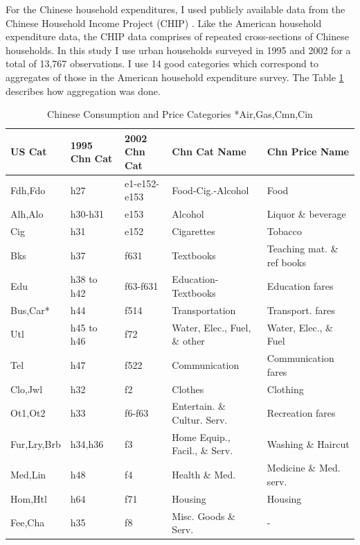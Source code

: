 \documentclass[12pt]{article}
\begin{document}
For the Chinese household expenditures, I used publicly available data from the Chinese Household Income Project (CHIP) \citep{CHIP2002}. Like the American household expenditure data, the CHIP data comprises of repeated cross-sections of Chinese households.  In this study I use urban households surveyed in 1995 and 2002 for a total of 13,767 observations.  I use 14 good categories which correspond to aggregates of those in the American household expenditure survey.   The Table \ref{tab:chncons} describes how aggregation was done.  
\begin{table}
    \centering
    \footnotesize
    \begin{sideways}
	\begin{tabular}{|l|l|l|l|l|}
	    	\hline
		\textbf{US Cat}			 & \textbf{1995 Chn Cat}  & \textbf{2002 Chn Cat}  & \textbf{Chn Cat Name} & \textbf{Chn Price Name}\\
		\hline
		Fdh,Fdo	 		 & h27	 	 & e1-e152-e153	 & Food-Cig.-Alcohol	 		 	 & Food\\ 
		\hline
		Alh,Alo	 		 & h30-h31	 & e153	 	 & Alcohol	 				 & Liquor \& beverage\\
		\hline
		Cig	 		 & h31	 	 & e152	 	 & Cigarettes	 				 & Tobacco\\ 
		\hline
		Bks	 		 & h37	 	 & f631	 	 & Textbooks	 				 & Teaching mat. \& ref books\\ 
		\hline
		Edu	 		 & h38 to h42	 & f63-f631	 & Education-Textbooks	 	 		 & Education fares\\ 
		\hline
		Bus,Car*		 & h44	 	 & f514	 	 & Transportation	 			 & Transport. fares\\ 
		\hline
		Utl	 		 & h45 to h46	 & f72	 	 & Water, Elec., Fuel, \& other	 	 	 & Water, Elec., \& Fuel\\ 
		\hline
		Tel	 		 & h47	 	 & f522	 	 & Communication	 			 & Communication fares\\ 
		\hline
		Clo,Jwl	 		 & h32	 	 & f2 	  	 & Clothes	 				 & Clothing\\ 
		\hline
		Ot1,Ot2	 		 & h33	 	 & f6-f63	 & Entertain. \& Cultur. Serv.		 	 & Recreation fares\\ 
		\hline
		Fur,Lry,Brb	 	 & h34,h36	 & f3 	 	 & Home Equip., Facil., \& Serv.		 & Washing \& Haircut\\ 
		\hline
		Med,Lin	 		 & h48	 	 & f4 	 	 & Health \& Med. 			 	 & Medicine \& Med. serv.\\ 
		\hline
		Hom,Htl	 		 & h64	 	 & f71	 	 & Housing	 			 	 & Housing\\ 
		\hline
		Fee,Cha	 		 & h35	 	 & f8 	 	 & Misc. Goods \& Serv.			 	 & -\\ 
		\hline
	\end{tabular}
	\end{sideways}
    \caption{Chinese Consumption and Price Categories \scriptsize{*Air,Gas,Cmn,Cin}}
    \label{tab:chncons}
\end{table}
\end{document}
